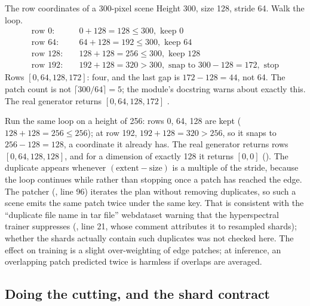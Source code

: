 \begin{worked}[label={we:trainloop:plan}]{The row coordinates of a 300-pixel scene}
Height 300, size 128, stride 64. Walk the loop.
\begin{align*}
\text{row } 0:&\quad 0 + 128 = 128 \le 300, \text{ keep } 0\\
\text{row } 64:&\quad 64 + 128 = 192 \le 300, \text{ keep } 64\\
\text{row } 128:&\quad 128 + 128 = 256 \le 300, \text{ keep } 128\\
\text{row } 192:&\quad 192 + 128 = 320 > 300, \text{ snap to } 300 - 128 = 172, \text{ stop}
\end{align*}
Rows $[0, 64, 128, 172]$: four, and the last gap is $172 - 128 = 44$, not 64. The patch count is
not $\lceil 300/64 \rceil = 5$; the module's docstring warns about exactly this. The real
generator returns $[0, 64, 128, 172]$ \tagC.
\end{worked}

\begin{sourcenote}
Run the same loop on a height of 256: rows 0, 64, 128 are kept ($128 + 128 = 256 \le 256$); at
row 192, $192 + 128 = 320 > 256$, so it snaps to $256 - 128 = 128$, a coordinate it already
has. The real generator returns rows $[0, 64, 128, 128]$, and for a dimension of exactly 128 it
returns $[0, 0]$ \tagC{} (). The
duplicate appears whenever $(\text{extent} - \text{size})$ is a multiple of the stride, because
the loop continues while  rather than stopping once a patch has
reached the edge. The patcher (,
line 96) iterates the plan without removing duplicates, so such a scene emits the same patch
twice under the same key. That is consistent with the ``duplicate file name in tar file''
webdataset warning that the hyperspectral trainer suppresses
(, line 21, whose
comment attributes it to resampled shards); whether the shards actually contain such
duplicates was not checked here. The effect on training is a slight over-weighting of edge
patches; at inference, an overlapping patch predicted twice is harmless if overlaps are
averaged.
\end{sourcenote}

\subsection{Doing the cutting, and the shard contract}

